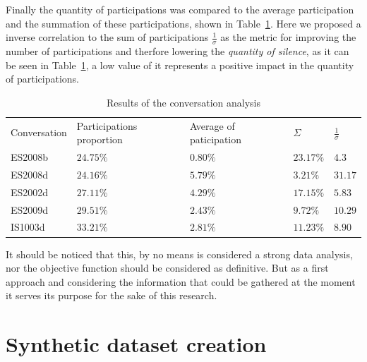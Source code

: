 Finally the quantity of participations was compared to the average participation and the summation of these participations, shown in Table~\ref{table:results_ami}. Here we proposed a inverse correlation to the sum of participations $\frac{1}{\sigma}$ as the metric for improving the number of participations and therfore lowering the \textit{quantity of silence}, as it can be seen in Table~\ref{table:results_ami}, a low value of it represents a positive impact in the quantity of participations.\\

\begin{table}[]
    \begin{tabular}{lllll}
    Conversation & Participations proportion & Average  of paticipation & $\Sigma$ & $\frac{1}{\sigma}$ \\
    ES2008b      & $24.75\%$                 & $0.80\%$                                                              & $23.17\%$  & $4.3$               \\
    ES2008d      & $24.16\%$                 & $5.79\%$                                                              & $3.21\%$   & $31.17$              \\
    ES2002d      & $27.11\%$                 & $4.29\%$                                                              & $17.15\%$  & $5.83$               \\
    ES2009d      & $29.51\%$                 & $2.43\%$                                                                & $9.72\%$   & $10.29$              \\
    IS1003d      & $33.21\%$                 & $2.81\%$                                                                & $11.23\%$  & $8.90$             
    \end{tabular}
    \caption{Results of the conversation analysis}
    \label{table:results_ami}
\end{table}

It should be noticed that this, by no means is considered a strong data analysis, nor the objective function should be considered as definitive. But as a first approach and considering the information that could be gathered at the moment it serves its purpose for the sake of this research.\\

\section{Synthetic dataset creation}

